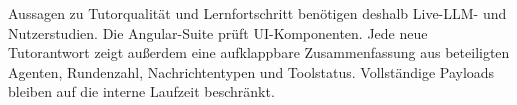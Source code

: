 Aussagen zu Tutorqualität und Lernfortschritt benötigen deshalb Live-LLM- und
Nutzerstudien. Die Angular-Suite prüft UI-Komponenten. Jede neue Tutorantwort
zeigt außerdem eine aufklappbare Zusammenfassung aus beteiligten
Agenten, Rundenzahl, Nachrichtentypen und Toolstatus. Vollständige Payloads
bleiben auf die interne Laufzeit beschränkt.
